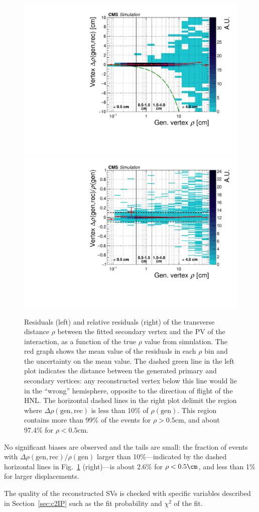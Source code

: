 \begin{figure}[h!]
  \centering
  \includegraphics[width=.4\textwidth]{Figures/c6/selection/genvtx_recvtx_Drho_vs_rho_afterSel_zoom.pdf}
  \includegraphics[width=.4\textwidth]{Figures/c6/selection/genvtx_recvtx_RelDrho_vs_rho_afterSel_zoom.pdf}
  \caption{Residuals (left) and relative residuals (right) of the
    transverse distance $\rho$ between the fitted secondary vertex and
    the PV of the interaction, as a function of the true $\rho$ value
    from simulation. 
    The red graph shows the mean value of the
    residuals in each $\rho$ bin and the uncertainty on the mean
    value. The dashed green line in the left plot indicates the
    distance between the generated primary and secondary vertices: any
    reconstructed vertex below this line would lie in the ``wrong''
    hemisphere, opposite to the direction of flight of the HNL.
    The horizontal dashed lines in the right plot delimit the region
    where $\Delta\rho(\mathrm{gen,rec})$ is less than 10\% of
    $\rho(\mathrm{gen})$. This region contains more than 99\% of
    the events for $\rho>0.5$cm, and about 97.4\% for $\rho<0.5$cm.
    \dani}
  \label{fig:svResidVsRho_all}
\end{figure}

No significant biases are observed and
the tails are small: the fraction of events with
$\Delta\rho(\mathrm{gen,rec})/\rho(\mathrm{gen})$ larger than
10\%---indicated by the dashed horizontal lines in
Fig.~\ref{fig:svResidVsRho_all} (right)---is about 2.6\% for $\rho<0.5\cm$, and less than 1\% for larger
displacements.

The quality of the reconstructed SVs is checked with specific
variables described in Section~\ref{sec:c2IP} such as the fit
probability and $\chi^2$ of the fit. 

